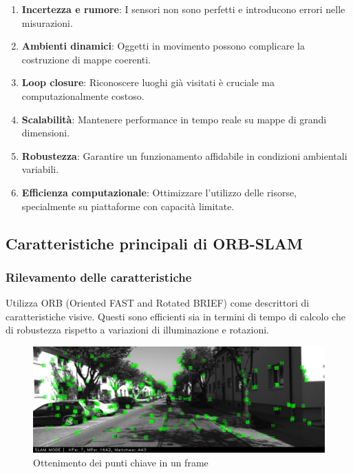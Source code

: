 \documentclass[12pt,a4paper]{report}
\begin{document}
\begin{enumerate}
    \item \textbf{Incertezza e rumore}: I sensori non sono perfetti e introducono errori nelle misurazioni.
    \item \textbf{Ambienti dinamici}: Oggetti in movimento possono complicare la costruzione di mappe coerenti.
    \item \textbf{Loop closure}: Riconoscere luoghi già visitati è cruciale ma computazionalmente costoso.
    \item \textbf{Scalabilità}: Mantenere performance in tempo reale su mappe di grandi dimensioni.
    \item \textbf{Robustezza}: Garantire un funzionamento affidabile in condizioni ambientali variabili.
    \item \textbf{Efficienza computazionale}: Ottimizzare l'utilizzo delle risorse, specialmente su piattaforme con capacità limitate.
\end{enumerate}

\newpage

\subsection{Caratteristiche principali di ORB-SLAM}

\subsubsection{Rilevamento delle caratteristiche}
        Utilizza ORB (Oriented FAST and Rotated BRIEF) come descrittori di caratteristiche visive. Questi sono efficienti sia in termini di tempo di calcolo che di robustezza rispetto a variazioni di illuminazione e rotazioni.


\begin{figure}[h]
    \centering
    \includegraphics[width=1\linewidth]{img/ORB_SLAM2_feature.png}
    \caption{Ottenimento dei punti chiave in un frame \cite{SLAM2_Feature}}
\end{figure}
\end{document}
